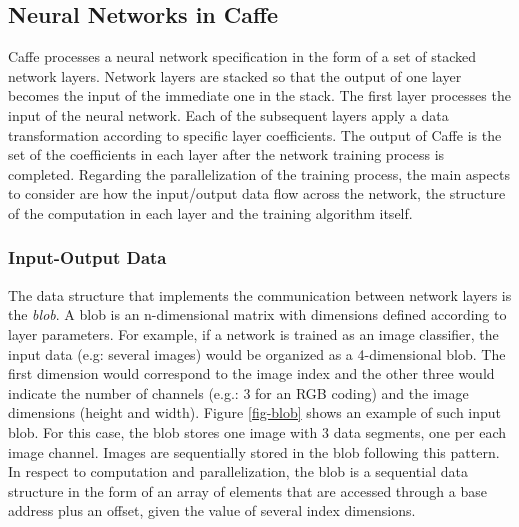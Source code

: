 \subsection{Neural Networks in Caffe}
Caffe processes a neural network specification in the form of a set
of stacked network layers. Network layers are stacked
so that the output of one layer becomes the input of the immediate
one in the stack. The first layer processes the input of the neural
network. Each of the subsequent layers apply a data transformation 
according to specific layer coefficients. The output of Caffe is the 
set of the coefficients in each layer after the network training process is
completed. Regarding the parallelization of the training process, the
main aspects to consider are how the input/output data flow across
the network, the structure of the computation in each layer and the
training algorithm itself.

\subsubsection{Input-Output Data}
The data structure that implements the communication between
network layers is the \emph{blob}. A blob is an n-dimensional matrix with
dimensions defined according to layer parameters. For example, if
a network is trained as an image classifier, the input data (e.g:
several images) would be organized as a 4-dimensional blob. The
first dimension would correspond to the image index and the other
three would indicate the number of channels (e.g.: 3 for an RGB
coding) and the image dimensions (height and width). Figure \ref{fig-blob}
shows an example of such input blob. For this case, the blob 
stores one image with 3 data segments, one per each image channel. 
Images are sequentially stored in the blob following this pattern. 
In respect to computation and parallelization, the blob
is a sequential data structure in the form of an array of elements
that are accessed through a base address plus an offset, given the
value of several index dimensions.


